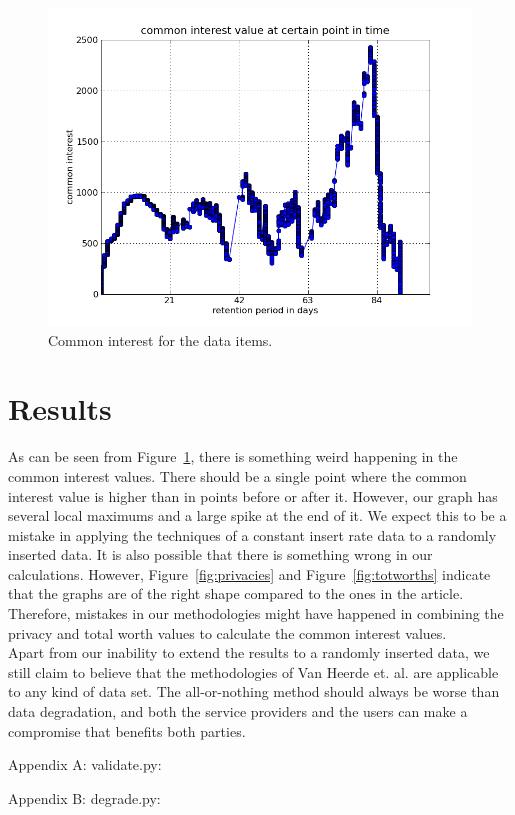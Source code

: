 \documentclass[a4paper,12pt,oneside,fleqn]{article}
\newcommand{\flabel}[1]{\label{fig:#1}}
\newcommand{\fref}[1]{Figure~\ref{fig:#1}}
\begin{document}
\begin{figure}[h]
\includegraphics[width=\linewidth]{img/common_interests.png}
\caption{Common interest for the data items.}
\flabel{cinterests}
\end{figure}

\clearpage
\section{Results}

As can be seen from \fref{cinterests}, there is something weird
happening in the common interest values. There should be a single
point where the common interest value is higher than in points before
or after it. However, our graph has several local maximums and a large
spike at the end of it. We expect this to be a mistake in applying the
techniques of a constant insert rate data to a randomly inserted
data. It is also possible that there is something wrong in our
calculations. However, \fref{privacies} and \fref{totworths} indicate
that the graphs are of the right shape compared to the ones in the
article. Therefore, mistakes in our methodologies might have happened
in combining the privacy and total worth values to calculate the
common interest values.\\

Apart from our inability to extend the results to a randomly inserted
data, we still claim to believe that the methodologies of Van Heerde
et. al. are applicable to any kind of data set. The all-or-nothing
method should always be worse than data degradation, and both the
service providers and the users can make a compromise that benefits
both parties.

\clearpage
\nocite{*}



\lstset{
language=Python,
basicstyle=\footnotesize\ttfamily,
numbers=left,
numberstyle=\tiny,
numberstyle=\footnotesize,
showstringspaces=false
}

\clearpage
Appendix A: validate.py:


\clearpage
Appendix B: degrade.py:

\end{document}

